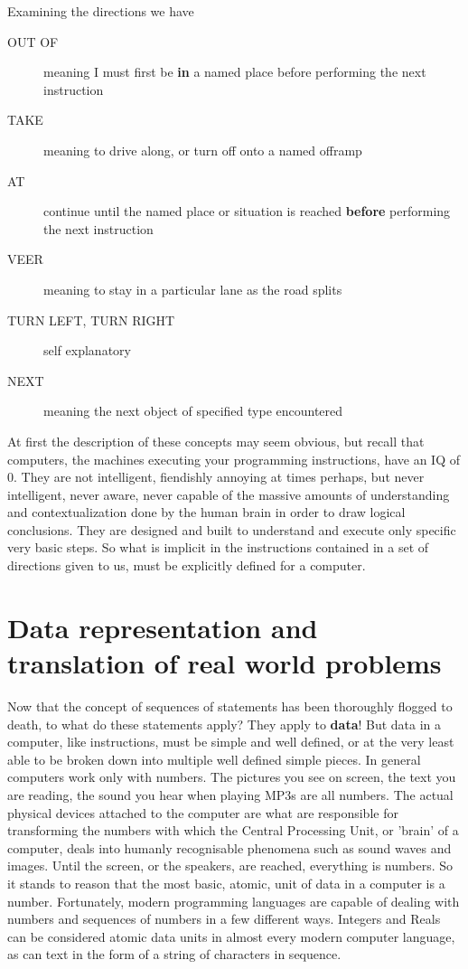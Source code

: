 Examining the directions we have
\begin{description}
	\item[OUT OF] meaning I must first be \textbf{in} a named place    before performing the next instruction
	\item[TAKE] meaning to drive along, or turn off onto a named offramp
	\item[AT] continue until the named place or situation is reached    \textbf{before} performing the next instruction
	\item[VEER] meaning to stay in a particular lane as the road splits
	\item[TURN LEFT, TURN RIGHT] self explanatory
	\item[NEXT] meaning the next object of specified type encountered
\end{description}

At first the description of these concepts may seem obvious, but   recall that computers, the machines executing your programming   instructions, have an IQ of 0. They are not intelligent, fiendishly   annoying at times perhaps, but never intelligent, never aware, never   capable of the massive amounts of understanding and contextualization done   by the human brain in order to draw logical conclusions. They are designed and built to understand and   execute only specific very basic steps. So what is implicit in the   instructions contained in a set of directions given to us, must be   explicitly defined for a computer.

\section{Data representation and translation of real world problems}

Now that the concept of sequences of statements has been thoroughly   flogged to death, to what do these statements apply? They apply to   \textbf{data}! But data in a computer, like instructions, must   be simple and well defined, or at the very least able to be broken down   into multiple well defined simple pieces. In general computers work   only with numbers. The pictures you see on screen, the text you are   reading, the sound you hear when playing MP3s are all numbers. The   actual physical devices attached to the computer are what are   responsible for transforming the numbers with which the Central Processing Unit, or 'brain' of a computer, deals into   humanly recognisable phenomena such as sound waves and images. Until   the screen, or the speakers, are reached, everything is numbers.  So it   stands to reason that the most basic, atomic, unit of data in a   computer is a number. Fortunately, modern programming languages are   capable of dealing with numbers and sequences of numbers in a few   different ways. Integers and Reals can be considered atomic data units   in almost every modern computer language, as can text in the form of a   string of characters in sequence.

